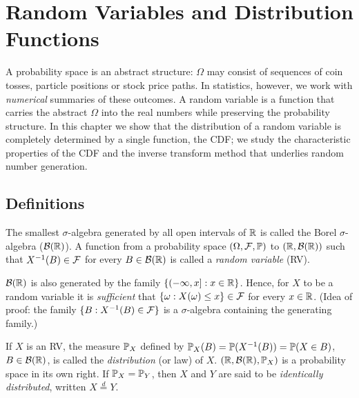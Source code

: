 \documentclass[main.tex]{subfiles}
\begin{document}
\chapter{Random Variables and Distribution Functions}\label{ch:rastgele-degiskenler}

A probability space is an abstract structure: $\Omega$ may consist of sequences of coin tosses, particle positions or stock price paths. In statistics, however, we work with \emph{numerical} summaries of these outcomes. A random variable is a function that carries the abstract $\Omega$ into the real numbers while preserving the probability structure. In this chapter we show that the distribution of a random variable is completely determined by a single function, the CDF; we study the characteristic properties of the CDF and the inverse transform method that underlies random number generation.

\section{Definitions}

\begin{definition}\label{def:rd}
The smallest $\sigma$-algebra generated by all open intervals of $\R$ is called the Borel $\sigma$-algebra ($\B(\R)$). A function from a probability space $(\Omega, \F, \P)$ to $(\R, \B(\R))$ such that $X^{-1}(B) \in \F$ for every $B \in \B(\R)$ is called a \emph{random variable} (RV).
\end{definition}

\begin{remark}
$\B(\R)$ is also generated by the family $\{(-\infty,x]: x\in\R\}$. Hence, for $X$ to be a random variable it is \emph{sufficient} that $\{\omega: X(\omega)\le x\}\in\F$ for every $x\in\R$. (Idea of proof: the family $\{B : X^{-1}(B)\in\F\}$ is a $\sigma$-algebra containing the generating family.)
\end{remark}

\begin{definition}[Distribution]
If $X$ is an RV, the measure $\P_X$ defined by $\P_X(B)=\P(X^{-1}(B))=\P(X\in B)$, $B\in\B(\R)$, is called the \emph{distribution} (or law) of $X$. $(\R,\B(\R),\P_X)$ is a probability space in its own right. If $\P_X=\P_Y$, then $X$ and $Y$ are said to be \emph{identically distributed}, written $X\overset{d}{=}Y$.
\end{definition}
\end{document}
